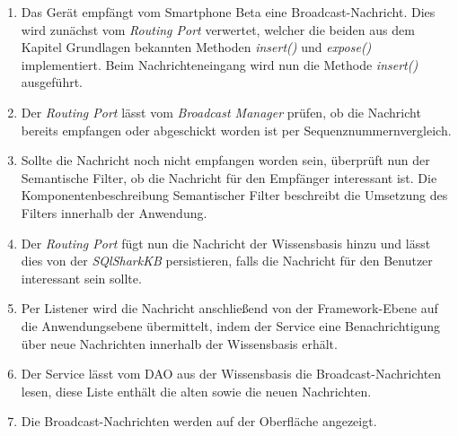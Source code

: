 \begin{enumerate}
	\item Das Gerät empfängt vom Smartphone Beta eine Broadcast-Nachricht. Dies wird zunächst vom \textit{Routing Port} verwertet, welcher die beiden aus dem Kapitel Grundlagen bekannten Methoden \textit{insert()} und \textit{expose()} implementiert. Beim Nachrichteneingang wird nun die Methode \textit{insert()} ausgeführt.
	\item Der \textit{Routing Port} lässt vom \textit{Broadcast Manager} prüfen, ob die Nachricht bereits empfangen oder abgeschickt worden ist per Sequenznummernvergleich.
	\item Sollte die Nachricht noch nicht empfangen worden sein, überprüft nun der Semantische Filter, ob die Nachricht für den Empfänger interessant ist. Die Komponentenbeschreibung Semantischer Filter beschreibt die Umsetzung des Filters innerhalb der Anwendung. 
	\item Der \textit{Routing Port} fügt nun die Nachricht der Wissensbasis hinzu und lässt dies von der \textit{SQlSharkKB} persistieren, falls die Nachricht für den Benutzer interessant sein sollte.
	\item Per Listener wird die Nachricht anschließend von der Framework-Ebene auf die Anwendungsebene übermittelt, indem der Service eine Benachrichtigung über neue Nachrichten innerhalb der Wissensbasis erhält. 
	\item Der Service lässt vom DAO aus der Wissensbasis die Broadcast-Nachrichten lesen, diese Liste enthält die alten sowie die neuen Nachrichten.
	\item Die Broadcast-Nachrichten werden auf der Oberfläche angezeigt.
\end{enumerate}


